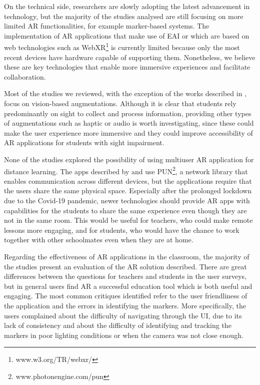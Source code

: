 On the technical side, researchers are slowly adopting the latest advancement in technology, but the majority of the studies analysed are still focusing on more limited \gls{AR} functionalities, for example marker-based systems. The implementation of \gls{AR} applications that make use of \gls{EAI} or which are based on web technologies such as WebXR\footnote{www.w3.org/TR/webxr/} is currently limited because only the most recent devices have hardware capable of supporting them. Nonetheless, we believe these are key technologies that enable more immersive experiences and facilitate collaboration. 

Most of the studies we reviewed, with the exception of the works described in \citep{chen2018application, kenoui2020teach, mikulowski2020multi}, focus on vision-based augmentations. Although it is clear that students rely predominantly on sight to collect and process information, providing other types of augmentations such as haptic or audio is worth investigating, since these could make the user experience more immersive and they could improve accessibility of \gls{AR} applications for students with sight impairment.

None of the studies explored the possibility of using multiuser AR application for distance learning. The apps described by \citet{oh2017hybrid} and \citet{lopez2020emofindar} use PUN\footnote{www.photonengine.com/pun}, a network library that enables communication across different devices, but the applications require that the users share the same physical space. Especially after the prolonged lockdown due to the Covid-19 pandemic, newer technologies should provide AR apps with capabilities for the students to share the same experience even though they are not in the same room. This would be useful for teachers, who could make remote lessons more engaging, and for students, who would have the chance to work together with other schoolmates even when they are at home.  

Regarding the effectiveness of AR applications in the classroom, the majority of the studies present an evaluation of the \gls{AR} solution described. There are great differences between the questions for teachers and students in the user surveys, but in general users find \gls{AR} a successful education tool which is both useful and engaging. The most common critiques identified refer to the user friendliness of the application and the errors in identifying the markers. More specifically, the users complained about the difficulty of navigating through the UI, due to its lack of consistency and about the difficulty of identifying and tracking the markers in poor lighting conditions or when the camera was not close enough.